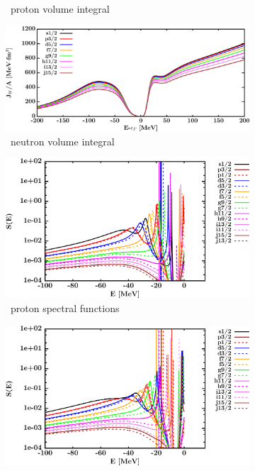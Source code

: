 \begin{figure}[hbtp]
\begin{subfigure}[b]{0.45\textwidth}
        \caption{\pbEight\ proton volume integral}
        \label{DOMFitData_pb208_proton_potentialIntegral}
    \end{subfigure}\hspace{6pt}
    \begin{subfigure}[b]{0.45\textwidth}
        \centering
        \includegraphics[width=\linewidth]{figures/pb208_neutronVolumeIntegrals.png}
        \caption{\pbEight\ neutron volume integral}
        \label{DOMFitData_pb208_neutron_potentialIntegral}
    \end{subfigure}\vspace{0.3in}
    \begin{subfigure}[b]{0.45\textwidth}
        \centering
        \includegraphics[width=\linewidth]{figures/pb208_protonSpectralFunctions.png}
        \caption{\pbEight\ proton spectral functions}
        \label{DOMFitData_pb208_proton_spectralFunctions}
    \end{subfigure}\hspace{6pt}
    \begin{subfigure}[b]{0.45\textwidth}
        \centering
        \includegraphics[width=\linewidth]{figures/pb208_neutronSpectralFunctions.png}

\end{subfigure}
\end{figure}
